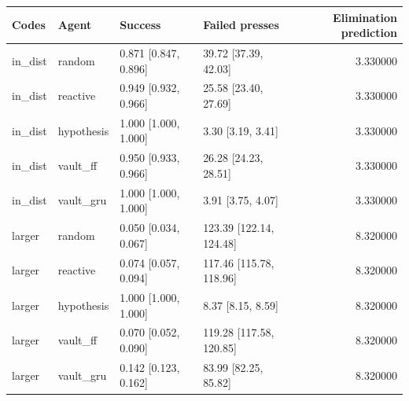 \begin{tabular}{llllr}
\toprule
Codes & Agent & Success & Failed presses & Elimination prediction \\
\midrule
in\_dist & random & 0.871 [0.847, 0.896] & 39.72 [37.39, 42.03] & 3.330000 \\
in\_dist & reactive & 0.949 [0.932, 0.966] & 25.58 [23.40, 27.69] & 3.330000 \\
in\_dist & hypothesis & 1.000 [1.000, 1.000] & 3.30 [3.19, 3.41] & 3.330000 \\
in\_dist & vault\_ff & 0.950 [0.933, 0.966] & 26.28 [24.23, 28.51] & 3.330000 \\
in\_dist & vault\_gru & 1.000 [1.000, 1.000] & 3.91 [3.75, 4.07] & 3.330000 \\
larger & random & 0.050 [0.034, 0.067] & 123.39 [122.14, 124.48] & 8.320000 \\
larger & reactive & 0.074 [0.057, 0.094] & 117.46 [115.78, 118.96] & 8.320000 \\
larger & hypothesis & 1.000 [1.000, 1.000] & 8.37 [8.15, 8.59] & 8.320000 \\
larger & vault\_ff & 0.070 [0.052, 0.090] & 119.28 [117.58, 120.85] & 8.320000 \\
larger & vault\_gru & 0.142 [0.123, 0.162] & 83.99 [82.25, 85.82] & 8.320000 \\
\bottomrule
\end{tabular}
